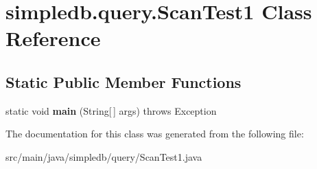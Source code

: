 \hypertarget{classsimpledb_1_1query_1_1ScanTest1}{}\section{simpledb.\+query.\+Scan\+Test1 Class Reference}
\label{classsimpledb_1_1query_1_1ScanTest1}
\subsection*{Static Public Member Functions}
\begin{DoxyCompactItemize}
\item 
\mbox{\label{classsimpledb_1_1query_1_1ScanTest1_a21581581c8a50cadf97fa76648c64502}} 
static void {\bfseries main} (String\mbox{[}$\,$\mbox{]} args)  throws Exception 
\end{DoxyCompactItemize}


The documentation for this class was generated from the following file\+:\begin{DoxyCompactItemize}
\item 
src/main/java/simpledb/query/Scan\+Test1.\+java\end{DoxyCompactItemize}
